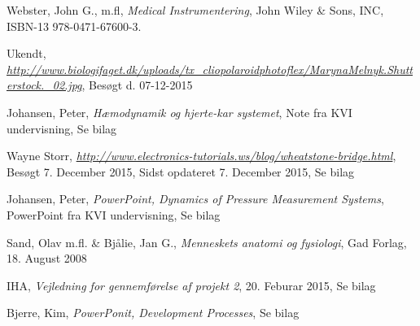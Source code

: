 \begin{thebibliography}{9}
	Webster, John G., m.fl, 
	\emph{Medical Instrumentering},
	John Wiley \& Sons, INC, 
	ISBN-13 978-0471-67600-3.
	
	Ukendt,
	\emph{\url{http://www.biologifaget.dk/uploads/tx_cliopolaroidphotoflex/MarynaMelnyk.Shutterstock._02.jpg}},
	Besøgt d. 07-12-2015	
	
	Johansen, Peter, 
	\emph{Hæmodynamik og hjerte-kar systemet},
	Note fra KVI undervisning, 
	Se bilag
	
	 Wayne Storr, 
	 \emph{\url{http://www.electronics-tutorials.ws/blog/wheatstone-bridge.html}}, 
	 Besøgt 7. December 2015,
	 Sidst opdateret 7. December 2015,
	 Se bilag
	 
	 Johansen, Peter, 
	 \emph{PowerPoint, Dynamics of Pressure Measurement Systems},
	 PowerPoint fra KVI undervisning, 
	 Se bilag
	 
	 Sand, Olav m.fl. \& Bjålie, Jan G., 
	 \emph{Menneskets anatomi og fysiologi},
	 Gad Forlag, 
	 18. August 2008
	 
	 IHA, 
	 \emph{Vejledning for gennemførelse af projekt 2},
	 20. Feburar 2015,
	 Se bilag
	 
	 Bjerre, Kim, 
	 \emph{PowerPonit, Development Processes},
	 Se bilag
	 
\end{thebibliography}

